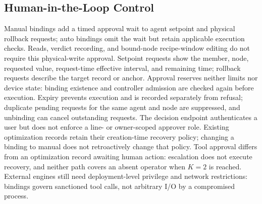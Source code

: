 \subsection{Human-in-the-Loop Control}
\label{sec:hitl}
Manual bindings add a timed approval wait to agent setpoint and physical
rollback requests; auto bindings omit the wait but retain applicable execution checks.
Reads, verdict recording, and bound-node recipe-window editing do not
require this physical-write approval. Setpoint requests
show the member, node, requested value, request-time effective interval, and
remaining time; rollback requests describe the target record or anchor.
Approval reserves neither limits nor device state: binding existence and
controller admission are checked again before execution. Expiry prevents
execution and is recorded separately from refusal; duplicate pending requests
for the same agent and node are suppressed, and unbinding can cancel
outstanding requests. The decision endpoint authenticates a user but does
not enforce a line- or owner-scoped approver role. Existing optimization
records retain their creation-time recovery policy; changing a binding to
manual does not retroactively change that policy. Tool approval differs from an optimization record
awaiting human action: escalation does not execute recovery, and neither path
covers an absent operator when $K=2$ is reached. External engines still need
deployment-level privilege and network restrictions: bindings govern
sanctioned tool calls, not arbitrary I/O by a compromised process.
